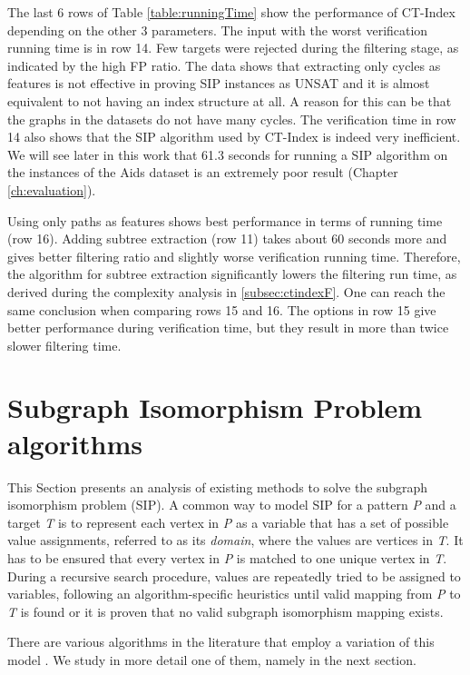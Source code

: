 \documentclass{l4proj}
\begin{document}
The last 6 rows of Table \ref{table:runningTime} show the performance of CT-Index depending on the other 3 parameters. The input with the worst verification running time is in row 14. Few targets were rejected during the filtering stage, as indicated by the high FP ratio. The data shows that extracting only cycles as features is not effective in proving SIP instances as UNSAT and it is almost equivalent to not having an index structure at all. A reason for this can be that the graphs in the datasets do not have many cycles. The verification time in row 14 also shows that the SIP algorithm used by CT-Index is indeed very inefficient. We will see later in this work that 61.3 seconds for running a SIP algorithm on the instances of the Aids dataset is an extremely poor result (Chapter \ref{ch:evaluation}).

Using only paths as features shows best performance in terms of running time (row 16). Adding subtree extraction (row 11) takes about 60 seconds more and gives better filtering ratio and slightly worse verification running time. Therefore, the algorithm for subtree extraction significantly lowers the filtering run time, as derived during the complexity analysis in \ref{subsec:ctindexF}. One can reach the same conclusion when comparing rows 15 and 16. The options in row 15 give better performance during verification time, but they result in more than twice slower filtering time.


\section{Subgraph Isomorphism Problem algorithms}
This Section presents an analysis of existing methods to solve the subgraph isomorphism problem (SIP). A common way to model SIP for a pattern \emph{P} and a target \emph{T} is to represent each vertex in \emph{P} as a variable that has a set of possible value assignments, referred to as its \emph{domain}, where the values are vertices in \emph{T}. It has to be ensured that every vertex in \emph{P} is matched to one unique vertex in \emph{T}. During a recursive search procedure, values are repeatedly tried to be assigned to variables, following an algorithm-specific heuristics until valid mapping from \emph{P} to \emph{T} is found or it is proven that no valid subgraph isomorphism mapping exists.
 
There are various algorithms in the literature that employ a variation of this model \cite{Solnon:2010, Ullmann:1976, Regin:1995, Larrosa:2002, Solnon:2010a, CP2015}. We study in more detail one of them, namely \cite{CP2015} in the next section.
\end{document}

